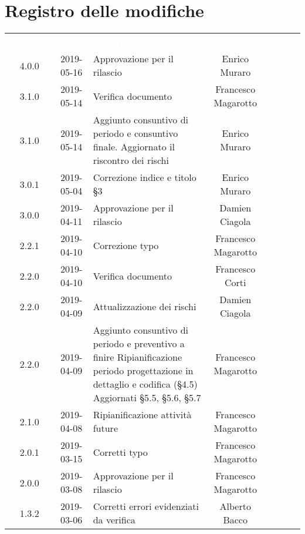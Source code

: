 \section*{Registro delle modifiche}
{
	\renewcommand{\arraystretch}{1.5}
	\centering
	\begin{longtable}{ c c  C{4cm}  c  c }
		
		\textcolor{white}{\textbf{Versione}} & \textcolor{white}{\textbf{Data}} & \textcolor{white}{\textbf{Descrizione}} & \textcolor{white}{\textbf{Autore}} & \textcolor{white}{\textbf{Ruolo}}\\
		
		4.0.0 & 2019-05-16 & Approvazione per il rilascio & Enrico Muraro & \Res{}\\
		3.1.0 & 2019-05-14 & Verifica documento & Francesco Magarotto & \ver{}\\
		3.1.0 & 2019-05-14 & Aggiunto consuntivo di periodo e consuntivo finale. Aggiornato il riscontro dei rischi & Enrico Muraro & \reda{}\\
		3.0.1 & 2019-05-04 & Correzione indice e titolo §3 & Enrico Muraro & \reda{}\\
		3.0.0 & 2019-04-11 & Approvazione per il rilascio & Damien Ciagola & \Res{}\\
		2.2.1 & 2019-04-10 & Correzione typo & Francesco Magarotto & \reda{} \\
		2.2.0 & 2019-04-10 & Verifica documento & Francesco Corti & \ver{} \\
		2.2.0 & 2019-04-09 & Attualizzazione dei rischi & Damien Ciagola & \Res{} \\
		
		2.2.0 & 2019-04-09 & Aggiunto consuntivo di periodo e preventivo a finire \newline Ripianificazione periodo progettazione in dettaglio e codifica (§4.5) \newline Aggiornati §5.5, §5.6, §5.7 & Francesco Magarotto & \reda{}\\
		
		2.1.0 & 2019-04-08 & Ripianificazione attività future & Francesco Magarotto & \reda{} \\
		2.0.1 & 2019-03-15 & Corretti typo & Francesco Magarotto & \reda{}\\
		
		
		2.0.0 & 2019-03-08 & Approvazione per il rilascio & Francesco Magarotto & \Res{}\\
		
		1.3.2 & 2019-03-06 & Corretti errori evidenziati da verifica & Alberto Bacco & \reda{}\\
		

\end{longtable}}
